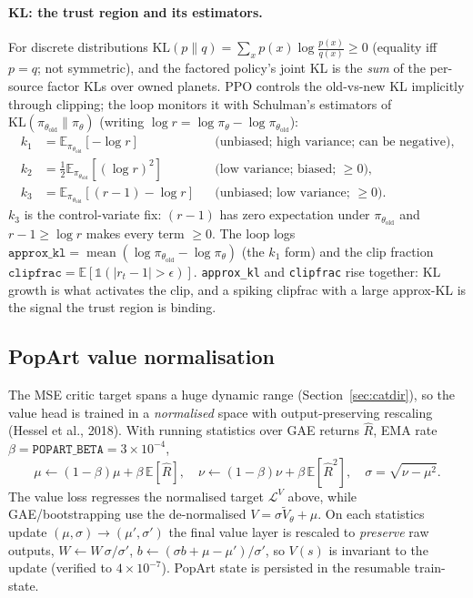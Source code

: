 \documentclass[11pt]{article}
\newcommand{\E}{\mathbb{E}}
\newcommand{\KL}{\mathrm{KL}}
\newcommand{\pol}{\pi_\theta}
\newcommand{\polold}{\pi_{\theta_{\mathrm{old}}}}
\newcommand{\cd}[1]{\texttt{#1}}
\begin{document}
\paragraph{KL: the trust region and its estimators.} For discrete distributions
$\KL(p\|q)=\sum_x p(x)\log\frac{p(x)}{q(x)}\ge0$ (equality iff $p{=}q$; not symmetric), and the factored
policy's joint KL is the \emph{sum} of the per-source factor KLs over owned planets. PPO controls the
old-vs-new KL implicitly through clipping; the loop monitors it with Schulman's estimators of
$\KL(\polold\|\pol)$ (writing $\log r=\log\pol-\log\polold$):
\begin{align}
k_1&=\E_{\polold}[-\log r] && \text{(unbiased; high variance; can be negative),}\\
k_2&=\tfrac12\E_{\polold}[(\log r)^2] && \text{(low variance; biased; }\ge0\text{),}\\
k_3&=\E_{\polold}[(r-1)-\log r] && \text{(unbiased; low variance; }\ge0\text{).}
\end{align}
$k_3$ is the control-variate fix: $(r-1)$ has zero expectation under $\polold$ and $r-1\ge\log r$ makes
every term $\ge0$. The loop logs $\cd{approx\_kl}=\operatorname{mean}(\log\polold-\log\pol)$ (the $k_1$
form) and the clip fraction $\cd{clipfrac}=\E[\mathbb 1(|r_t-1|>\epsilon)]$. \cd{approx\_kl} and
\cd{clipfrac} rise together: KL growth is what activates the clip, and a spiking clipfrac with a large
approx-KL is the signal the trust region is binding.

\subsection{PopArt value normalisation}\label{sec:popart}
The MSE critic target spans a huge dynamic range (Section~\ref{sec:catdir}), so the value head is trained
in a \emph{normalised} space with output-preserving rescaling (Hessel et al., 2018). With running
statistics over GAE returns $\hat R$, EMA rate $\beta=\cd{POPART\_BETA}=3\!\times\!10^{-4}$,
\begin{equation}
\mu\leftarrow(1{-}\beta)\mu+\beta\,\E[\hat R],\quad
\nu\leftarrow(1{-}\beta)\nu+\beta\,\E[\hat R^2],\quad
\sigma=\sqrt{\nu-\mu^2}.
\end{equation}
The value loss regresses the normalised target $\mathcal L^V$ above, while GAE/bootstrapping use the
de-normalised $V=\sigma\tilde V_\theta+\mu$. On each statistics update $(\mu,\sigma)\to(\mu',\sigma')$ the
final value layer is rescaled to \emph{preserve} raw outputs,
$W\leftarrow W\,\sigma/\sigma'$, $b\leftarrow(\sigma b+\mu-\mu')/\sigma'$, so $V(s)$ is invariant to the
update (verified to $4\!\times\!10^{-7}$). PopArt state is persisted in the resumable train-state.
\end{document}
